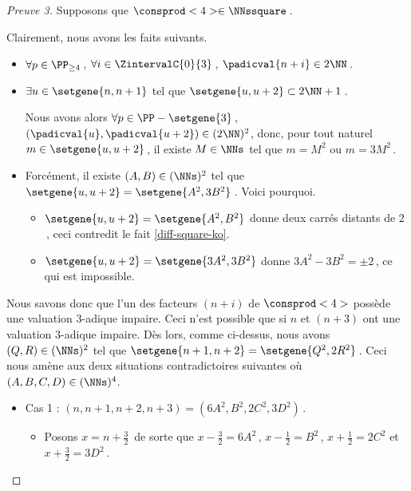 	
\begin{proof}[Preuve 3]
    Supposons que $\consprod<4> \in \NNssquare$\,.
    
    \smallskip
    
	Clairement, nous avons les faits suivants.
    \begin{itemize}
    	\item  
		$\forall p \in \PP_{\geq 4}$\,, 
   		$\forall i \in \ZintervalC{0}{3}$\,, 
    	$\padicval{n + i} \in 2 \NN$\,.
	
	
		\item $\exists u \in \setgene{n, n+1}$ tel que $\setgene{u, u + 2} \subset 2 \NN + 1$\,.
		
		\noindent
		Nous avons alors
		$\forall p \in \PP - \setgene{3}$\,, 
   		$(\padicval{u}, \padicval{u+2}) \in ( 2 \NN )^2$,
		donc, pour tout naturel $m \in \setgene{u, u + 2}$\,, 
		il existe $M \in \NNs$ tel que 
		$m = M^2$ ou $m = 3 M^2$\,.
	
	
		\item Forcément, il existe $(A, B) \in ( \NNs )^2$ tel que 
        $\setgene{u, u + 2} = \setgene{A^2, 3 B^2}$\,. Voici pourquoi.
        \begin{itemize}
        	\item $\setgene{u, u + 2} = \setgene{A^2, B^2}$ donne deux carrés distants de $2$\,, ceci contredit le fait \ref{diff-square-ko}.

        	\item $\setgene{u, u + 2} = \setgene{3 A^2, 3 B^2}$ donne $3 A^2 - 3 B^2 = \pm 2$\,, ce qui est impossible.
        \end{itemize}
    \end{itemize}

    \smallskip
	
	Nous savons donc que l'un des facteurs $(n+i)$ de $\consprod<4>$ possède une valuation $3$-adique impaire. Ceci n'est possible que si $n$ et $(n+3)$ ont une valuation $3$-adique impaire.
	Dès lors, comme ci-dessus, nous avons $(Q, R) \in ( \NNs )^2$ tel que $\setgene{n+1, n+2} = \setgene{Q^2, 2 R^2}$\,.
	Ceci nous amène aux deux situations contradictoires suivantes où $(A, B, C, D) \in ( \NNs )^4$.
	
    \begin{itemize}
    	\item Cas 1 : $(n, n+1, n+2, n+3) = (6A^2, B^2, 2C^2, 3D^2)$\,.
		\begin{itemize}
        	\item Posons $x = n + \frac32$\, de sorte que 
        	$x - \frac32 = 6 A^2$\,, $x - \frac12 = B^2$\,, $x + \frac12 = 2 C^2$ et $x + \frac32 = 3 D^2$\,.
        

\end{itemize}
\end{itemize}
\end{proof}

